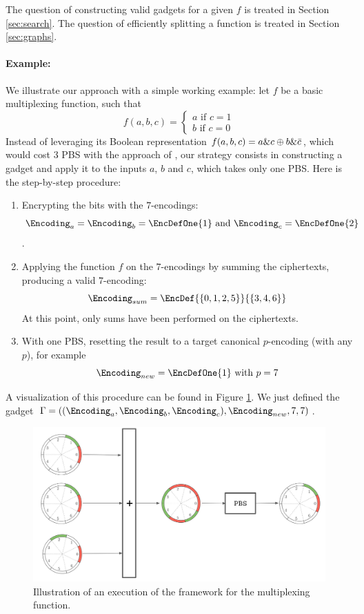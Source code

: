 The question of constructing valid gadgets for a given $f$ is treated in Section \ref{sec:search}. The question of efficiently splitting a function is treated in Section \ref{sec:graphs}.


\paragraph{Example:} We illustrate our approach with a simple working example: let $f$ be a basic multiplexing function, such that  $$
f(a, b, c) = \begin{cases}
    a \text{ if } c = 1\\
    b \text{ if } c = 0
\end{cases}
$$
Instead of leveraging its Boolean representation $f(a, b, c) = a \& c \oplus b \& \Bar{c}$, which would cost 3 PBS with the approach of \cite{cryptoeprint:2018/421}, our strategy consists in constructing a gadget and apply it to the inputs $a$, $b$ and $c$, which takes only one PBS. Here is the step-by-step procedure:

\begin{enumerate}
    \item Encrypting the bits with the $7$-encodings:\[\Encoding_a = \Encoding_b = \EncDefOne{1} \text{ and } \Encoding_c = \EncDefOne{2}\].
    \item Applying the function $f$ on the $7$-encodings by summing the ciphertexts, producing a valid $7$-encoding:\[\Encoding_{sum} = \EncDef{\{0, 1, 2, 5\}}{\{3, 4, 6\}}\] At this point, only sums have been performed on the ciphertexts.
    \smallskip
    \item With one PBS, resetting the result to a target canonical $p$-encoding (with any $p$), for example \[\Encoding_{new} = \EncDefOne{1} \text{ with } p=7\]
\end{enumerate}

A visualization of this procedure can be found in Figure \ref{fig:illustration}. We just defined the gadget $\Gamma = \left ( (\Encoding_a, \Encoding_b, \Encoding_c), \Encoding_{new}, 7, 7\right )$.

\begin{figure}
    \centering
    \includegraphics[width=\linewidth]{images/illustration_framework.png}
    \caption{Illustration of an execution of the framework for the multiplexing function.}
    \label{fig:illustration}
\end{figure}


